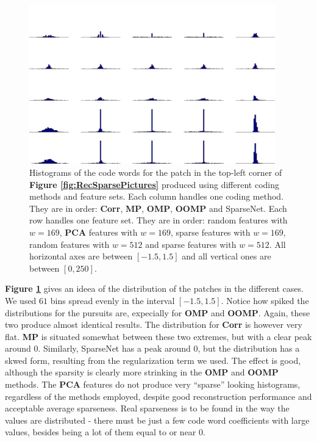 \documentclass[12pt,a4paper,oneside,english]{UPBThesis}
\begin{document}
\begin{figure}
\centering
\includegraphics[width=0.95\textwidth,height=0.8\textheight]{thesis_data/recsparse/rec_hists.png}
\caption{Histograms of the code words for the patch in the top-left corner of \textbf{Figure \ref{fig:RecSparsePictures}} produced using different coding methods and feature sets. Each column handles one coding method. They are in order: \textbf{Corr}, \textbf{MP}, \textbf{OMP}, \textbf{OOMP} and SparseNet. Each row handles one feature set. They are in order: random features with $w=169$, \textbf{PCA} features with $w=169$, sparse features with $w=169$, random features with $w=512$ and sparse features with $w=512$. All horizontal axes are between $[-1.5,1.5]$ and all vertical ones are between $[0,250]$.}
\label{fig:RecSparseHists}
\end{figure}

\textbf{Figure \ref{fig:RecSparseHists}} gives an ideea of the distribution of the patches in the different cases. We used $61$ bins spread evenly in the interval $[-1.5,1.5]$. Notice how spiked the distributions for the pursuits are, expecially for \textbf{OMP} and \textbf{OOMP}. Again, these two produce almost identical results. The distribution for \textbf{Corr} is however very flat. \textbf{MP} is situated somewhat between these two extremes, but with a clear peak around $0$. Similarly, SparseNet has a peak around $0$, but the distribution has a skwed form, resulting from the regularization term we used. The effect is good, although the sparsity is clearly more strinking in the \textbf{OMP} and \textbf{OOMP} methods. The \textbf{PCA} features do not produce very ``sparse'' looking histograms, regardless of the methods employed, despite good reconstruction performance and acceptable average sparseness. Real sparseness is to be found in the way the values are distributed - there must be just a few code word coefficients with large values, besides being a lot of them equal to or near $0$.
\end{document}
